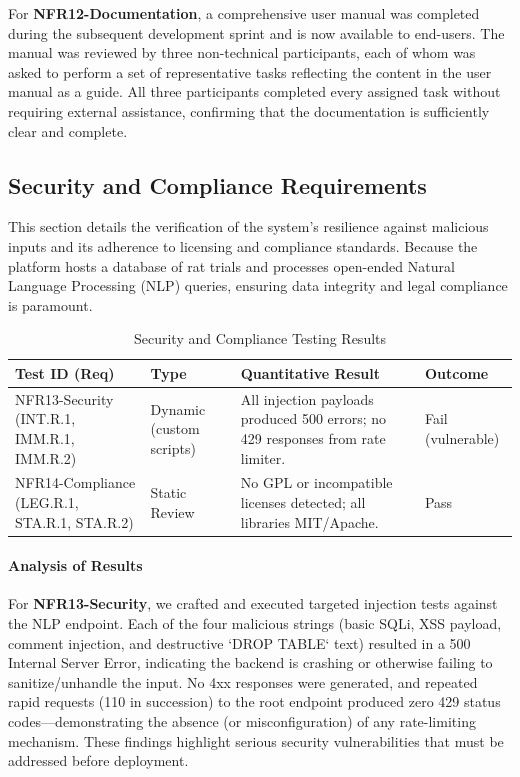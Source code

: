 \documentclass[12pt, titlepage]{article}
\begin{document}
For \textbf{NFR12-Documentation}, a comprehensive user manual was completed during the subsequent development sprint and is now available to end-users. The manual was reviewed by three non-technical participants, each of whom was asked to perform a set of representative tasks reflecting the content in the user manual as a guide. All three participants completed every assigned task without requiring external assistance, confirming that the documentation is sufficiently clear and complete.

\subsection{Security and Compliance Requirements}
\label{sec:security_compliance_results}

This section details the verification of the system's resilience against malicious inputs and its adherence to licensing and compliance standards. Because the platform hosts a database of rat trials and processes open-ended Natural Language Processing (NLP) queries, ensuring data integrity and legal compliance is paramount.

\begin{table}[h!]
\centering
\caption{Security and Compliance Testing Results}
\label{tab:security_results}
\begin{tabular}{|p{3cm}|p{2cm}|p{5cm}|p{3.5cm}|}
\hline
\textbf{Test ID (Req)} & \textbf{Type} & \textbf{Quantitative Result} & \textbf{Outcome} \\ \hline
NFR13-Security (INT.R.1, IMM.R.1, IMM.R.2) & Dynamic (custom scripts) & All injection payloads produced 500 errors; no 429 responses from rate limiter. & Fail (vulnerable) \\ \hline
NFR14-Compliance (LEG.R.1, STA.R.1, STA.R.2) & Static Review & No GPL or incompatible licenses detected; all libraries MIT/Apache. & Pass \\ \hline
\end{tabular}
\end{table}

\paragraph{Analysis of Results}
For \textbf{NFR13-Security}, we crafted and executed targeted injection tests against the NLP endpoint. Each of the four malicious strings (basic SQLi, XSS payload, comment injection, and destructive `DROP TABLE` text) resulted in a 500 Internal Server Error, indicating the backend is crashing or otherwise failing to sanitize/unhandle the input. No 4xx responses were generated, and repeated rapid requests (110 in succession) to the root endpoint produced zero 429 status codes—demonstrating the absence (or misconfiguration) of any rate-limiting mechanism. These findings highlight serious security vulnerabilities that must be addressed before deployment.
\end{document}
